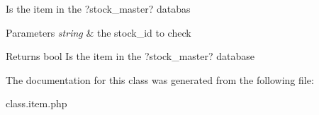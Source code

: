 Is the item in the ?stock\+\_\+master? databas


\begin{DoxyParams}{Parameters}
{\em string} & the stock\+\_\+id to check \\
\hline
\end{DoxyParams}
\begin{DoxyReturn}{Returns}
bool Is the item in the ?stock\+\_\+master? database 
\end{DoxyReturn}


The documentation for this class was generated from the following file\+:\begin{DoxyCompactItemize}
\item 
class.\+item.\+php\end{DoxyCompactItemize}
